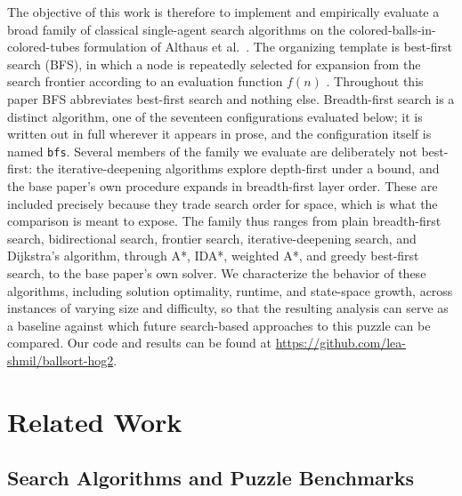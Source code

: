 \documentclass[letterpaper]{article}
\begin{document}
The objective of this work is therefore to implement and empirically
evaluate a broad family of classical single-agent search algorithms on the
colored-balls-in-colored-tubes formulation of Althaus et al.\
\cite{althaus2025}. The organizing template is best-first search (BFS), in
which a node is repeatedly selected for expansion from the search frontier
according to an evaluation function $f(n)$ \cite{pearl1984,russell2020}.
Throughout this paper BFS abbreviates best-first search and nothing else.
Breadth-first search is a distinct algorithm, one of the seventeen
configurations evaluated below; it is written out in full wherever it appears
in prose, and the configuration itself is named \texttt{bfs}.
Several members of the family we evaluate are deliberately not best-first:
the iterative-deepening algorithms explore depth-first under a bound, and
the base paper's own procedure expands in breadth-first layer order. These
are included precisely because they trade search order for space, which is
what the comparison is meant to expose. The family thus ranges from plain
breadth-first search, bidirectional search, frontier search,
iterative-deepening search, and Dijkstra's algorithm, through A*, IDA*,
weighted A*, and greedy best-first search, to the base paper's own solver.
We characterize the behavior of these algorithms, including solution
optimality, runtime, and state-space growth, across instances of varying
size and difficulty, so that the resulting analysis can serve as a baseline
against which future search-based approaches to this puzzle can be
compared.
Our code and results can be found at
\url{https://github.com/lea-shmil/ballsort-hog2}.

\section{Related Work}

\subsection{Search Algorithms and Puzzle Benchmarks}
\end{document}
